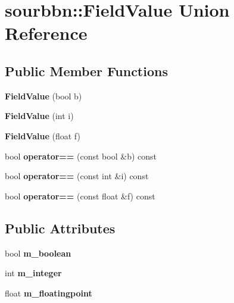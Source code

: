 \hypertarget{unionsourbbn_1_1FieldValue}{}\section{sourbbn\+:\+:Field\+Value Union Reference}
\label{unionsourbbn_1_1FieldValue}
\subsection*{Public Member Functions}
\begin{DoxyCompactItemize}
\item 
\mbox{\label{unionsourbbn_1_1FieldValue_ac386bca4d30d15b355de91255ae956e9}} 
{\bfseries Field\+Value} (bool b)
\item 
\mbox{\label{unionsourbbn_1_1FieldValue_a2fa73afc35afed15f2e70fdb5302abaf}} 
{\bfseries Field\+Value} (int i)
\item 
\mbox{\label{unionsourbbn_1_1FieldValue_ac7f2f906329e096f031d56b5d170835b}} 
{\bfseries Field\+Value} (float f)
\item 
\mbox{\label{unionsourbbn_1_1FieldValue_a5dc27bd466c3972d0eb9c72c9b3ede37}} 
bool {\bfseries operator==} (const bool \&b) const
\item 
\mbox{\label{unionsourbbn_1_1FieldValue_acfaa9b3f77181f887779204d51feebc7}} 
bool {\bfseries operator==} (const int \&i) const
\item 
\mbox{\label{unionsourbbn_1_1FieldValue_a7d6f9ec425bffde4bab3a818e53e123f}} 
bool {\bfseries operator==} (const float \&f) const
\end{DoxyCompactItemize}
\subsection*{Public Attributes}
\begin{DoxyCompactItemize}
\item 
\mbox{\label{unionsourbbn_1_1FieldValue_ac5a9ffea7e9e09c8b6832c1e186da35a}} 
bool {\bfseries m\+\_\+boolean}
\item 
\mbox{\label{unionsourbbn_1_1FieldValue_ab019c70e3552930d17a96920ed135c8e}} 
int {\bfseries m\+\_\+integer}
\item 
\mbox{\label{unionsourbbn_1_1FieldValue_a8d9b4ef51dbc3a010ca4ff3618b6e70c}} 
float {\bfseries m\+\_\+floatingpoint}
\end{DoxyCompactItemize}


